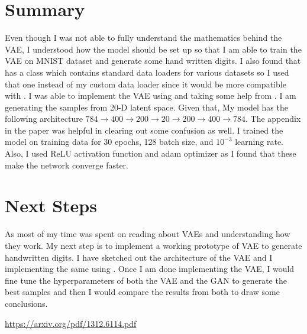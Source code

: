 \documentclass{article}
\begin{document}
\thispagestyle{firstpage}

\section{Summary}

Even though I was not able to fully understand the mathematics behind the VAE, I understood how the model should be set up so that I am able to train the VAE on MNIST dataset and generate some hand written digits. I also found that  has a  class which contains standard data loaders for various datasets so I used that one instead of my custom data loader since it would be more compatible with . I was able to implement the VAE using  and taking some help from . I am generating the samples from 20-D latent space. Given that, My model has the following architecture $784 \rightarrow 400 \rightarrow 200 \rightarrow 20 \rightarrow 200 \rightarrow 400 \rightarrow 784$. The appendix in the paper \cite{1} was helpful in clearing out some confusion as well. I trained the model on training data for 30 epochs, 128 batch size, and $10^{-3}$ learning rate. Also, I used ReLU activation function and adam optimizer as I found that these make the network converge faster.

\se

\section{Next Steps}

As most of my time was spent on reading about VAEs and understanding how they work. My next step is to implement a working prototype of VAE to generate handwritten digits. I have sketched out the architecture of the VAE and I implementing the same using . Once I am done implementing the VAE, I would fine tune the hyperparameters of both the VAE and the GAN to generate the best samples and then I would compare the results from both to draw some conclusions.


\begin{thebibliography}{1}

 \url{https://arxiv.org/pdf/1312.6114.pdf}

\end{thebibliography}
\end{document}
